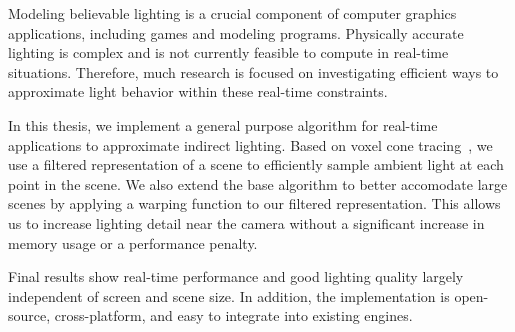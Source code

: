 Modeling believable lighting is a crucial component of computer graphics applications, including games and modeling programs. Physically accurate lighting is complex and is not currently feasible to compute in real-time situations. Therefore, much research is focused on investigating efficient ways to approximate light behavior within these real-time constraints.

In this thesis, we implement a general purpose algorithm for real-time applications to approximate indirect lighting. Based on voxel cone tracing~\cite{crassin2011interactive}, we use a filtered representation of a scene to efficiently sample ambient light at each point in the scene. We also extend the base algorithm to better accomodate large scenes by applying a warping function to our filtered representation. This allows us to increase lighting detail near the camera without a significant increase in memory usage or a performance penalty.

Final results show real-time performance and good lighting quality largely independent of screen and scene size. In addition, the implementation is open-source, cross-platform, and easy to integrate into existing engines.